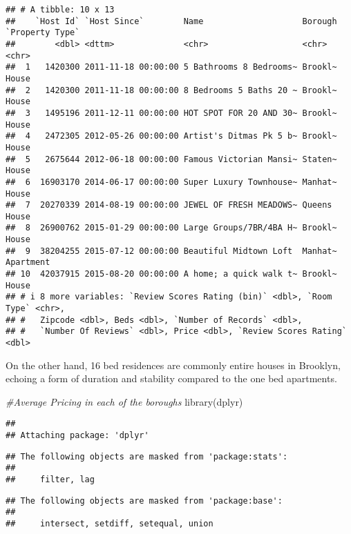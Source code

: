\documentclass[
]{article}
\newenvironment{Shaded}{\begin{snugshade}}{\end{snugshade}}
\newcommand{\CommentTok}[1]{\textcolor[rgb]{0.56,0.35,0.01}{\textit{#1}}}
\newcommand{\FunctionTok}[1]{\textcolor[rgb]{0.00,0.00,0.00}{#1}}
\newcommand{\NormalTok}[1]{#1}
\begin{document}
\begin{verbatim}
## # A tibble: 10 x 13
##    `Host Id` `Host Since`        Name                    Borough `Property Type`
##        <dbl> <dttm>              <chr>                   <chr>   <chr>          
##  1   1420300 2011-11-18 00:00:00 5 Bathrooms 8 Bedrooms~ Brookl~ House          
##  2   1420300 2011-11-18 00:00:00 8 Bedrooms 5 Baths 20 ~ Brookl~ House          
##  3   1495196 2011-12-11 00:00:00 HOT SPOT FOR 20 AND 30~ Brookl~ House          
##  4   2472305 2012-05-26 00:00:00 Artist's Ditmas Pk 5 b~ Brookl~ House          
##  5   2675644 2012-06-18 00:00:00 Famous Victorian Mansi~ Staten~ House          
##  6  16903170 2014-06-17 00:00:00 Super Luxury Townhouse~ Manhat~ House          
##  7  20270339 2014-08-19 00:00:00 JEWEL OF FRESH MEADOWS~ Queens  House          
##  8  26900762 2015-01-29 00:00:00 Large Groups/7BR/4BA H~ Brookl~ House          
##  9  38204255 2015-07-12 00:00:00 Beautiful Midtown Loft  Manhat~ Apartment      
## 10  42037915 2015-08-20 00:00:00 A home; a quick walk t~ Brookl~ House          
## # i 8 more variables: `Review Scores Rating (bin)` <dbl>, `Room Type` <chr>,
## #   Zipcode <dbl>, Beds <dbl>, `Number of Records` <dbl>,
## #   `Number Of Reviews` <dbl>, Price <dbl>, `Review Scores Rating` <dbl>
\end{verbatim}

On the other hand, 16 bed residences are commonly entire houses in
Brooklyn, echoing a form of duration and stability compared to the one
bed apartments.

\begin{Shaded}
\begin{Highlighting}[]
\CommentTok{\#Average Pricing in each of the boroughs}
\FunctionTok{library}\NormalTok{(dplyr)}
\end{Highlighting}
\end{Shaded}

\begin{verbatim}
## 
## Attaching package: 'dplyr'
\end{verbatim}

\begin{verbatim}
## The following objects are masked from 'package:stats':
## 
##     filter, lag
\end{verbatim}

\begin{verbatim}
## The following objects are masked from 'package:base':
## 
##     intersect, setdiff, setequal, union
\end{verbatim}
\end{document}

